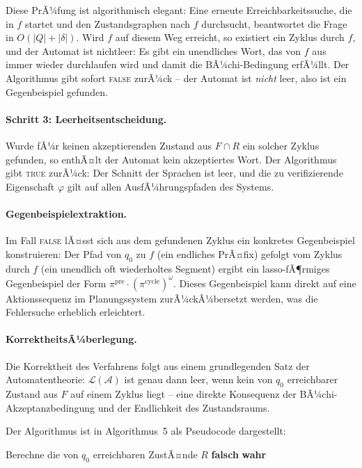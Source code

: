 ﻿\documentclass[a4paper,12pt]{article}
\theoremstyle{definition}
\begin{document}
Diese PrÃ¼fung ist algorithmisch elegant: Eine erneute Erreichbarkeitssuche, die in $f$ startet und den Zustandsgraphen nach $f$ durchsucht, beantwortet die Frage in $O(|Q| + |\delta|)$. Wird $f$ auf diesem Weg erreicht, so existiert ein Zyklus durch $f$, und der Automat ist nichtleer: Es gibt ein unendliches Wort, das von $f$ aus immer wieder durchlaufen wird und damit die BÃ¼chi-Bedingung erfÃ¼llt. Der Algorithmus gibt sofort \textsc{false} zurÃ¼ck -- der Automat ist \emph{nicht} leer, also ist ein Gegenbeispiel gefunden.

\paragraph*{Schritt 3: Leerheitsentscheidung.}
Wurde fÃ¼r keinen akzeptierenden Zustand aus $F \cap R$ ein solcher Zyklus gefunden, so enthÃ¤lt der Automat kein akzeptiertes Wort. Der Algorithmus gibt \textsc{true} zurÃ¼ck: Der Schnitt der Sprachen ist leer, und die zu verifizierende Eigenschaft $\varphi$ gilt auf allen AusfÃ¼hrungspfaden des Systems.

\paragraph*{Gegenbeispielextraktion.}
Im Fall \textsc{false} lÃ¤sst sich aus dem gefundenen Zyklus ein konkretes Gegenbeispiel konstruieren: Der Pfad von $q_0$ zu $f$ (ein endliches PrÃ¤fix) gefolgt vom Zyklus durch $f$ (ein unendlich oft wiederholtes Segment) ergibt ein lasso-fÃ¶rmiges Gegenbeispiel der Form $\pi^{\text{pre}} \cdot (\pi^{\text{cycle}})^\omega$. Dieses Gegenbeispiel kann direkt auf eine Aktionssequenz im Planungssystem zurÃ¼ckÃ¼bersetzt werden, was die Fehlersuche erheblich erleichtert.

\paragraph*{KorrektheitsÃ¼berlegung.}
Die Korrektheit des Verfahrens folgt aus einem grundlegenden Satz der Automaten\-theorie: $\mathcal{L}(\mathcal{A})$ ist genau dann leer, wenn kein von $q_0$ erreichbarer Zustand aus $F$ auf einem Zyklus liegt -- eine direkte Konsequenz der BÃ¼chi-Akzeptanzbedingung und der Endlichkeit des Zustandsraums.

Der Algorithmus ist in Algorithmus~5 als Pseudocode dargestellt:

\begin{algorithm}[H]
	\caption{BÃ¼chi-Leerheitstest}
	\begin{algorithmic}[1]
		\State Berechne die von $q_0$ erreichbaren ZustÃ¤nde $R$ 
				\State \Return \textbf{falsch} 
			\EndeWenn
		\EndeFuer
		\State \Return \textbf{wahr} 
		\EndProzedur
	\end{algorithmic}
\end{algorithm}
\end{document}

